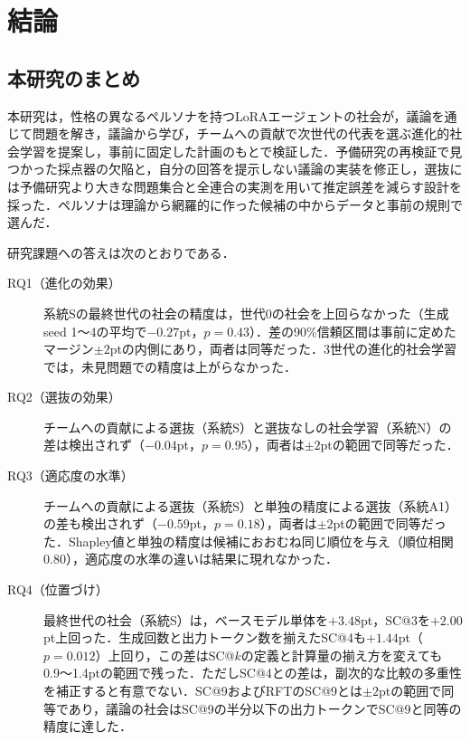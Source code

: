 

\chapter{結論}
\label{cha:7}

\section{本研究のまとめ}
\label{sec:7.1}

本研究は，性格の異なるペルソナを持つLoRAエージェントの社会が，議論を通じて問題を解き，議論から学び，チームへの貢献で次世代の代表を選ぶ進化的社会学習を提案し，事前に固定した計画のもとで検証した．予備研究の再検証で見つかった採点器の欠陥と，自分の回答を提示しない議論の実装を修正し，選抜には予備研究より大きな問題集合と全連合の実測を用いて推定誤差を減らす設計を採った．ペルソナは理論から網羅的に作った候補の中からデータと事前の規則で選んだ．

研究課題への答えは次のとおりである．

\begin{description}
\item[RQ1（進化の効果）] 系統Sの最終世代の社会の精度は，世代0の社会を上回らなかった（生成seed 1〜4の平均で$-0.27$pt，$p = 0.43$）．差の90\%信頼区間は事前に定めたマージン$\pm 2$ptの内側にあり，両者は同等だった．3世代の進化的社会学習では，未見問題での精度は上がらなかった．
\item[RQ2（選抜の効果）] チームへの貢献による選抜（系統S）と選抜なしの社会学習（系統N）の差は検出されず（$-0.04$pt，$p = 0.95$），両者は$\pm 2$ptの範囲で同等だった．
\item[RQ3（適応度の水準）] チームへの貢献による選抜（系統S）と単独の精度による選抜（系統A1）の差も検出されず（$-0.59$pt，$p = 0.18$），両者は$\pm 2$ptの範囲で同等だった．Shapley値と単独の精度は候補におおむね同じ順位を与え（順位相関0.80），適応度の水準の違いは結果に現れなかった．
\item[RQ4（位置づけ）] 最終世代の社会（系統S）は，ベースモデル単体を$+3.48$pt，SC@3を$+2.00$pt上回った．生成回数と出力トークン数を揃えたSC@4も$+1.44$pt（$p = 0.012$）上回り，この差はSC@$k$の定義と計算量の揃え方を変えても0.9〜1.4ptの範囲で残った．ただしSC@4との差は，副次的な比較の多重性を補正すると有意でない．SC@9およびRFTのSC@9とは$\pm 2$ptの範囲で同等であり，議論の社会はSC@9の半分以下の出力トークンでSC@9と同等の精度に達した．
\end{description}

